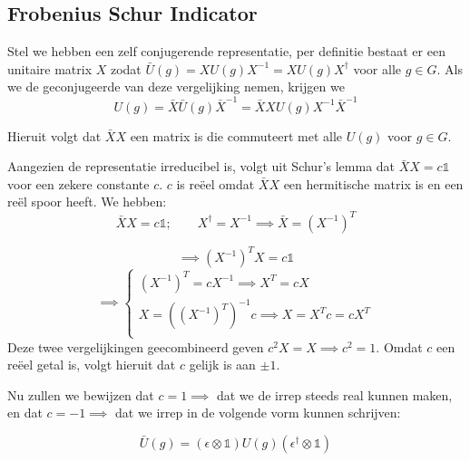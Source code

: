 \subsection{Frobenius Schur Indicator}

Stel we hebben een zelf conjugerende representatie, per definitie bestaat er een unitaire matrix \(X\) zodat \(\bar{U}(g) = X U(g) X^{-1} = XU(g)X^{\dagger} \) voor alle \(g \in G\).
Als we de geconjugeerde van deze vergelijking nemen, krijgen we 
\[U(g) = \bar{X} \bar{U}(g) \bar{X}^{-1} = \bar{X} X U(g) X^{-1} \bar{X}^{-1}\]

Hieruit volgt dat \(\bar{X} X\) een matrix is die commuteert met alle \(U(g)\) voor \(g \in G\).


Aangezien de representatie irreducibel is, volgt uit Schur's lemma dat \(\bar{X} X = c \mathds{1}\) voor een zekere constante \(c\).
\(c\) is reëel omdat \(\bar{X} X\) een hermitische matrix is en een reël spoor heeft.
We hebben:
\[\bar{X} X = c \mathds{1}; \qquad X^{\dagger} = X^{-1} \implies \bar{X} = (X^{-1})^{T}\]

\[\implies (X^{-1})^{T} X = c \mathds{1} \]
\[
\implies
\begin{cases}
    (X^{-1})^{T} =cX^{-1} \implies X^T = cX \\
     X = ((X^{-1})^T)^{-1}c \implies X = X^T c= c X^T\\
\end{cases}
\]
Deze twee vergelijkingen geecombineerd geven \(c^2 X = X \implies c^2 = 1\).
Omdat \(c\) een reëel getal is, volgt hieruit dat \(c\) gelijk is aan \(\pm 1\).

Nu zullen we bewijzen dat \(c=1 \implies\) dat we de irrep steeds real kunnen maken, en dat \(c=-1 \implies\) dat we irrep in de volgende vorm kunnen schrijven:

\[\bar{U}(g) = (\epsilon \otimes\mathds{1}) U(g) (\epsilon^{\dagger} \otimes\mathds{1})\]

